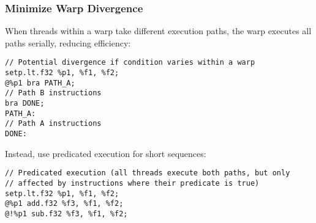 \subsubsection{Minimize Warp Divergence}

When threads within a warp take different execution paths, the warp executes all paths serially, reducing efficiency:

\begin{lstlisting}[style=ptx]
// Potential divergence if condition varies within a warp
setp.lt.f32 %p1, %f1, %f2;
@%p1 bra PATH_A;
// Path B instructions
bra DONE;
PATH_A:
// Path A instructions
DONE:
\end{lstlisting}

Instead, use predicated execution for short sequences:

\begin{lstlisting}[style=ptx]
// Predicated execution (all threads execute both paths, but only
// affected by instructions where their predicate is true)
setp.lt.f32 %p1, %f1, %f2;
@%p1 add.f32 %f3, %f1, %f2;
@!%p1 sub.f32 %f3, %f1, %f2;
\end{lstlisting}

